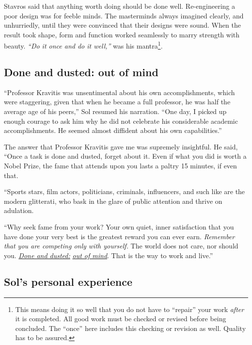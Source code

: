 \documentclass[
  a4paper,
]{article}
\begin{document}
Stavros said that anything worth doing should be done well.
Re-engineering a poor design was for feeble minds. The masterminds
always imagined clearly, and unhurriedly, until they were convinced that
their designs were sound. When the result took shape, form and function
worked seamlessly to marry strength with beauty. \emph{``Do it once and
do it well,''} was his mantra\footnote{This means doing it so well that
  you do not have to ``repair'' your work \emph{after} it is completed.
  All good work must be checked or revised before being concluded. The
  ``once'' here includes this checking or revision as well. Quality has
  to be assured.  \normalfont}.

\hypertarget{done-and-dusted-out-of-mind}{%
\subsection{Done and dusted: out of
mind}\label{done-and-dusted-out-of-mind}}

``Professor Kravitis was unsentimental about his own accomplishments,
which were staggering, given that when he became a full professor, he
was half the average age of his peers,'' Sol resumed his narration.
``One day, I picked up enough courage to ask him why he did not
celebrate his considerable academic accomplishments. He seemed almost
diffident about his own capabilities.''

The answer that Professor Kravitis gave me was supremely insightful. He
said, ``Once a task is done and dusted, forget about it. Even if what
you did is worth a Nobel Prize, the fame that attends upon you lasts a
paltry 15 minutes, if even that.

``Sports stars, film actors, politicians, criminals, influencers, and
such like are the modern glitterati, who bask in the glare of public
attention and thrive on adulation.

``Why seek fame from your work? Your own quiet, inner satisfaction that
you have done your very best is the greatest reward you can ever earn.
\emph{Remember that you are competing only with yourself.} The world
does not care, nor should you.
\href{https://www.macmillandictionary.com/dictionary/british/be-done-and-dusted}{\emph{Done
and dusted:}}
\href{https://www.merriam-webster.com/dictionary/out\%20of\%20mind}{\emph{out
of mind}}. That is the way to work and live.''

\hypertarget{sols-personal-experience}{%
\subsection{Sol's personal experience}\label{sols-personal-experience}}
\end{document}
